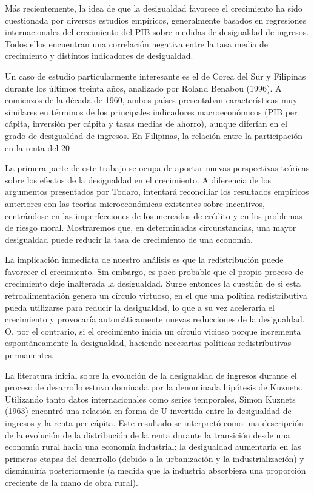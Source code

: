 \documentclass[10pt,a4paper]{article}
\begin{document}
Más recientemente, la idea de que la desigualdad favorece el crecimiento ha sido cuestionada por diversos estudios empíricos, generalmente basados en regresiones internacionales del crecimiento del PIB sobre medidas de desigualdad de ingresos. Todos ellos encuentran una correlación negativa entre la tasa media de crecimiento y distintos indicadores de desigualdad.

Un caso de estudio particularmente interesante es el de Corea del Sur y Filipinas durante los últimos treinta años, analizado por Roland Benabou (1996). A comienzos de la década de 1960, ambos países presentaban características muy similares en términos de los principales indicadores macroeconómicos (PIB per cápita, inversión per cápita y tasas medias de ahorro), aunque diferían en el grado de desigualdad de ingresos. En Filipinas, la relación entre la participación en la renta del 20 %

La primera parte de este trabajo se ocupa de aportar nuevas perspectivas teóricas sobre los efectos de la desigualdad en el crecimiento. A diferencia de los argumentos presentados por Todaro, intentará reconciliar los resultados empíricos anteriores con las teorías microeconómicas existentes sobre incentivos, centrándose en las imperfecciones de los mercados de crédito y en los problemas de riesgo moral. Mostraremos que, en determinadas circunstancias, una mayor desigualdad puede reducir la tasa de crecimiento de una economía.

La implicación inmediata de nuestro análisis es que la redistribución puede favorecer el crecimiento. Sin embargo, es poco probable que el propio proceso de crecimiento deje inalterada la desigualdad. Surge entonces la cuestión de si esta retroalimentación genera un círculo virtuoso, en el que una política redistributiva pueda utilizarse para reducir la desigualdad, lo que a su vez aceleraría el crecimiento y provocaría automáticamente nuevas reducciones de la desigualdad. O, por el contrario, si el crecimiento inicia un círculo vicioso porque incrementa espontáneamente la desigualdad, haciendo necesarias políticas redistributivas permanentes.

La literatura inicial sobre la evolución de la desigualdad de ingresos durante el proceso de desarrollo estuvo dominada por la denominada hipótesis de Kuznets. Utilizando tanto datos internacionales como series temporales, Simon Kuznets (1963) encontró una relación en forma de U invertida entre la desigualdad de ingresos y la renta per cápita. Este resultado se interpretó como una descripción de la evolución de la distribución de la renta durante la transición desde una economía rural hacia una economía industrial: la desigualdad aumentaría en las primeras etapas del desarrollo (debido a la urbanización y la industrialización) y disminuiría posteriormente (a medida que la industria absorbiera una proporción creciente de la mano de obra rural).
\end{document}
